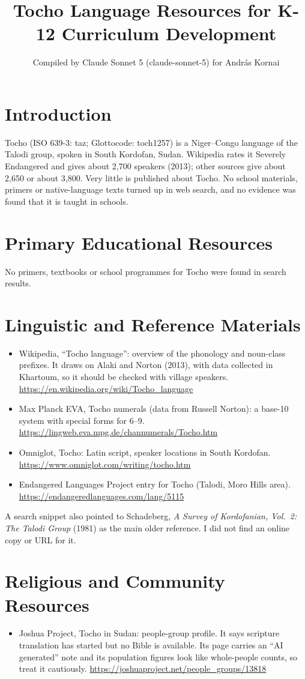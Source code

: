 \documentclass[12pt]{article}
\title{Tocho Language Resources for K-12 Curriculum Development}
\author{Compiled by Claude Sonnet 5 (claude-sonnet-5) for Andr\'as Kornai}
\date{}
\begin{document}
\maketitle

\section{Introduction}
Tocho (ISO 639-3: taz; Glottocode: toch1257) is a Niger--Congo language of the Talodi group, spoken in South Kordofan, Sudan. Wikipedia rates it Severely Endangered and gives about 2,700 speakers (2013); other sources give about 2,650 or about 3,800. Very little is published about Tocho. No school materials, primers or native-language texts turned up in web search, and no evidence was found that it is taught in schools.

\section{Primary Educational Resources}
No primers, textbooks or school programmes for Tocho were found in search results.

\section{Linguistic and Reference Materials}
\begin{itemize}
\item Wikipedia, ``Tocho language'': overview of the phonology and noun-class prefixes. It draws on Alaki and Norton (2013), with data collected in Khartoum, so it should be checked with village speakers. \url{https://en.wikipedia.org/wiki/Tocho_language}
\item Max Planck EVA, Tocho numerals (data from Russell Norton): a base-10 system with special forms for 6--9. \url{https://lingweb.eva.mpg.de/channumerals/Tocho.htm}
\item Omniglot, Tocho: Latin script, speaker locations in South Kordofan. \url{https://www.omniglot.com/writing/tocho.htm}
\item Endangered Languages Project entry for Tocho (Talodi, Moro Hills area). \url{https://endangeredlanguages.com/lang/5115}
\end{itemize}
A search snippet also pointed to Schadeberg, \emph{A Survey of Kordofanian, Vol.\ 2: The Talodi Group} (1981) as the main older reference. I did not find an online copy or URL for it.

\section{Religious and Community Resources}
\begin{itemize}
\item Joshua Project, Tocho in Sudan: people-group profile. It says scripture translation has started but no Bible is available. Its page carries an ``AI generated'' note and its population figures look like whole-people counts, so treat it cautiously. \url{https://joshuaproject.net/people_groups/13818}
\end{itemize}
\end{document}
